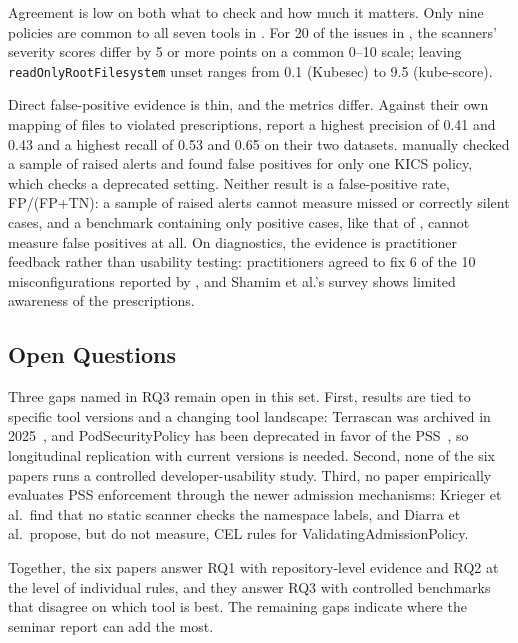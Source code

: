 \documentclass[sigconf,nonacm]{acmart}
\begin{document}
Agreement is low on both what to check and how much it matters. Only nine policies are common to all seven tools in \citet{minna2025}. For 20 of the issues in \citet{krieger2026}, the scanners' severity scores differ by 5 or more points on a common 0--10 scale; leaving \texttt{readOnlyRootFilesystem} unset ranges from 0.1 (Kubesec) to 9.5 (kube-score).

Direct false-positive evidence is thin, and the metrics differ. Against their own mapping of files to violated prescriptions, \citet{shamim2025} report a highest precision of 0.41 and 0.43 and a highest recall of 0.53 and 0.65 on their two datasets. \citet{minna2025} manually checked a sample of raised alerts and found false positives for only one KICS policy, which checks a deprecated setting. Neither result is a false-positive rate, FP/(FP+TN): a sample of raised alerts cannot measure missed or correctly silent cases, and a benchmark containing only positive cases, like that of \citet{eom2026}, cannot measure false positives at all. On diagnostics, the evidence is practitioner feedback rather than usability testing: practitioners agreed to fix 6 of the 10 misconfigurations reported by \citet{rahman2023}, and Shamim et al.'s survey shows limited awareness of the prescriptions.

\subsection{Open Questions}

Three gaps named in RQ3 remain open in this set. First, results are tied to specific tool versions and a changing tool landscape: Terrascan was archived in 2025~\cite{krieger2026}, and PodSecurityPolicy has been deprecated in favor of the PSS~\cite{minna2025,krieger2026}, so longitudinal replication with current versions is needed. Second, none of the six papers runs a controlled developer-usability study. Third, no paper empirically evaluates PSS enforcement through the newer admission mechanisms: Krieger et al.\ find that no static scanner checks the namespace labels, and Diarra et al.\ propose, but do not measure, CEL rules for ValidatingAdmissionPolicy.

Together, the six papers answer RQ1 with repository-level evidence and RQ2 at the level of individual rules, and they answer RQ3 with controlled benchmarks that disagree on which tool is best. The remaining gaps indicate where the seminar report can add the most.



\end{document}
